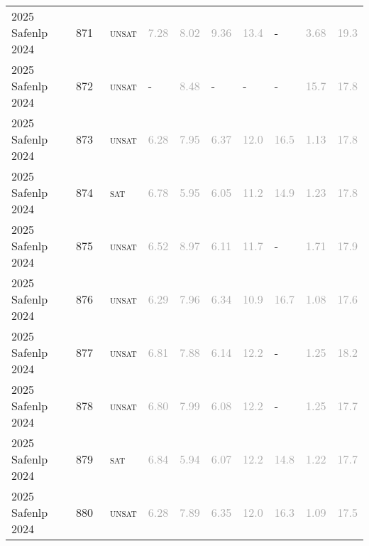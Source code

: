 \begin{center}
{\begin{longtable}{@{}llllllllll@{}}
2025 Safenlp 2024 & 871 & ~\textsc{unsat} & \textcolor{darkgray}{7.28} & \textcolor{darkgray}{8.02} & \textcolor{darkgray}{9.36} & \textcolor{darkgray}{13.4} & - & \textcolor{darkgray}{3.68} & \textcolor{darkgray}{19.3} \\
2025 Safenlp 2024 & 872 & ~\textsc{unsat} & - & \textcolor{darkgray}{8.48} & - & - & - & \textcolor{darkgray}{15.7} & \textcolor{darkgray}{17.8} \\
2025 Safenlp 2024 & 873 & ~\textsc{unsat} & \textcolor{darkgray}{6.28} & \textcolor{darkgray}{7.95} & \textcolor{darkgray}{6.37} & \textcolor{darkgray}{12.0} & \textcolor{darkgray}{16.5} & \textcolor{darkgray}{1.13} & \textcolor{darkgray}{17.8} \\
2025 Safenlp 2024 & 874 & ~\textsc{sat} & \textcolor{darkgray}{6.78} & \textcolor{darkgray}{5.95} & \textcolor{darkgray}{6.05} & \textcolor{darkgray}{11.2} & \textcolor{darkgray}{14.9} & \textcolor{darkgray}{1.23} & \textcolor{darkgray}{17.8} \\
2025 Safenlp 2024 & 875 & ~\textsc{unsat} & \textcolor{darkgray}{6.52} & \textcolor{darkgray}{8.97} & \textcolor{darkgray}{6.11} & \textcolor{darkgray}{11.7} & - & \textcolor{darkgray}{1.71} & \textcolor{darkgray}{17.9} \\
2025 Safenlp 2024 & 876 & ~\textsc{unsat} & \textcolor{darkgray}{6.29} & \textcolor{darkgray}{7.96} & \textcolor{darkgray}{6.34} & \textcolor{darkgray}{10.9} & \textcolor{darkgray}{16.7} & \textcolor{darkgray}{1.08} & \textcolor{darkgray}{17.6} \\
2025 Safenlp 2024 & 877 & ~\textsc{unsat} & \textcolor{darkgray}{6.81} & \textcolor{darkgray}{7.88} & \textcolor{darkgray}{6.14} & \textcolor{darkgray}{12.2} & - & \textcolor{darkgray}{1.25} & \textcolor{darkgray}{18.2} \\
2025 Safenlp 2024 & 878 & ~\textsc{unsat} & \textcolor{darkgray}{6.80} & \textcolor{darkgray}{7.99} & \textcolor{darkgray}{6.08} & \textcolor{darkgray}{12.2} & - & \textcolor{darkgray}{1.25} & \textcolor{darkgray}{17.7} \\
2025 Safenlp 2024 & 879 & ~\textsc{sat} & \textcolor{darkgray}{6.84} & \textcolor{darkgray}{5.94} & \textcolor{darkgray}{6.07} & \textcolor{darkgray}{12.2} & \textcolor{darkgray}{14.8} & \textcolor{darkgray}{1.22} & \textcolor{darkgray}{17.7} \\
2025 Safenlp 2024 & 880 & ~\textsc{unsat} & \textcolor{darkgray}{6.28} & \textcolor{darkgray}{7.89} & \textcolor{darkgray}{6.35} & \textcolor{darkgray}{12.0} & \textcolor{darkgray}{16.3} & \textcolor{darkgray}{1.09} & \textcolor{darkgray}{17.5} \\

\end{longtable}}
\end{center}
